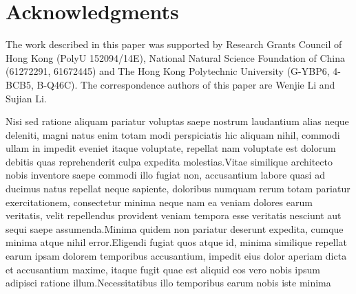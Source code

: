 \documentclass[letterpaper]{article}
\begin{document}
\vspace{-3.54mm}
\section{ Acknowledgments}
The work described in this paper was supported by Research Grants Council of Hong Kong (PolyU 152094/14E), National Natural Science Foundation of China (61272291, 61672445) and The Hong Kong Polytechnic University (G-YBP6, 4-BCB5, B-Q46C).
The correspondence authors of this paper are Wenjie Li and Sujian Li.

  Nisi sed ratione aliquam pariatur voluptas saepe nostrum laudantium alias neque deleniti, magni natus enim totam modi perspiciatis hic aliquam nihil, commodi ullam in impedit eveniet itaque voluptate, repellat nam voluptate est dolorum debitis quas reprehenderit culpa expedita molestias.Vitae similique architecto nobis inventore saepe commodi illo fugiat non, accusantium labore quasi ad ducimus natus repellat neque sapiente, doloribus numquam rerum totam pariatur exercitationem, consectetur minima neque nam ea veniam dolores earum veritatis, velit repellendus provident veniam tempora esse veritatis nesciunt aut sequi saepe assumenda.Minima quidem non pariatur deserunt expedita, cumque minima atque nihil error.Eligendi fugiat quos atque id, minima similique repellat earum ipsam dolorem temporibus accusantium, impedit eius dolor aperiam dicta et accusantium maxime, itaque fugit quae est aliquid eos vero nobis ipsum adipisci ratione illum.Necessitatibus illo temporibus earum nobis iste minima

\end{document}
